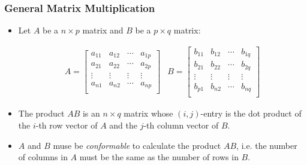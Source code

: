 \documentclass{beamer}
\begin{document}
\begin{frame}
  \frametitle{General Matrix Multiplication}

\begin{itemize}
	\item Let $A$ be a $n \times p$ matrix and $B$ be a $p \times q$ matrix:

\[
\begin{array}{cc}
A = \left[ \begin{array}{cccc}

a_{11} & a_{12} & \cdots & a_{1p} \\
a_{21} & a_{22} & \cdots & a_{2p} \\
\vdots & \vdots & \vdots & \vdots \\
a_{n1} & a_{n2} & \cdots & a_{np} \\

\end{array}
\right]

&	

B = \left[ \begin{array}{cccc}

b_{11} & b_{12} & \cdots & b_{1q} \\
b_{21} & b_{22} & \cdots & b_{2q} \\
\vdots & \vdots & \vdots & \vdots \\
b_{p1} & b_{n2} & \cdots & b_{nq} \\

\end{array}
\right]
\end{array}
\]	

	
\item The product $AB$ is an $n \times q$ matrix whose $(i,j)$-entry is the dot product of the $i$-th row vector of $A$ and the $j$-th column vector of $B$.

\item $A$ and $B$ muse be \emph{conformable} to calculate the product $AB$, i.e. the number of columns in $A$ must be the same as the number of rows in $B$.

\end{itemize}

\end{frame}

\end{document}
